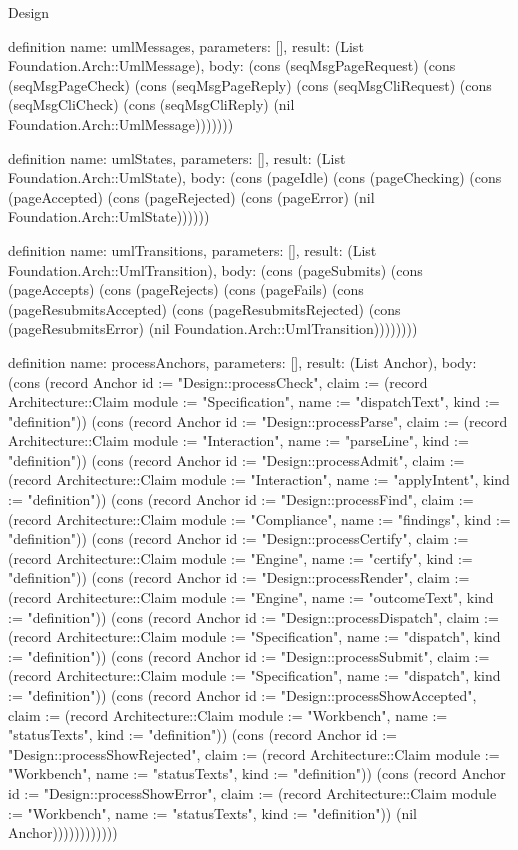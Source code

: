 \begin{lexlean}{Design}
\begin{semanticmodule}
definition{
  name: umlMessages,
  parameters: [],
  result: (List Foundation.Arch::UmlMessage),
  body: (cons (seqMsgPageRequest) (cons (seqMsgPageCheck) (cons (seqMsgPageReply) (cons (seqMsgCliRequest) (cons (seqMsgCliCheck) (cons (seqMsgCliReply) (nil Foundation.Arch::UmlMessage)))))))
}

definition{
  name: umlStates,
  parameters: [],
  result: (List Foundation.Arch::UmlState),
  body: (cons (pageIdle) (cons (pageChecking) (cons (pageAccepted) (cons (pageRejected) (cons (pageError) (nil Foundation.Arch::UmlState))))))
}

definition{
  name: umlTransitions,
  parameters: [],
  result: (List Foundation.Arch::UmlTransition),
  body: (cons (pageSubmits) (cons (pageAccepts) (cons (pageRejects) (cons (pageFails) (cons (pageResubmitsAccepted) (cons (pageResubmitsRejected) (cons (pageResubmitsError) (nil Foundation.Arch::UmlTransition))))))))
}

definition{
  name: processAnchors,
  parameters: [],
  result: (List Anchor),
  body: (cons (record Anchor {id := "Design::processCheck", claim := (record Architecture::Claim {module := "Specification", name := "dispatchText", kind := "definition"})}) (cons (record Anchor {id := "Design::processParse", claim := (record Architecture::Claim {module := "Interaction", name := "parseLine", kind := "definition"})}) (cons (record Anchor {id := "Design::processAdmit", claim := (record Architecture::Claim {module := "Interaction", name := "applyIntent", kind := "definition"})}) (cons (record Anchor {id := "Design::processFind", claim := (record Architecture::Claim {module := "Compliance", name := "findings", kind := "definition"})}) (cons (record Anchor {id := "Design::processCertify", claim := (record Architecture::Claim {module := "Engine", name := "certify", kind := "definition"})}) (cons (record Anchor {id := "Design::processRender", claim := (record Architecture::Claim {module := "Engine", name := "outcomeText", kind := "definition"})}) (cons (record Anchor {id := "Design::processDispatch", claim := (record Architecture::Claim {module := "Specification", name := "dispatch", kind := "definition"})}) (cons (record Anchor {id := "Design::processSubmit", claim := (record Architecture::Claim {module := "Specification", name := "dispatch", kind := "definition"})}) (cons (record Anchor {id := "Design::processShowAccepted", claim := (record Architecture::Claim {module := "Workbench", name := "statusTexts", kind := "definition"})}) (cons (record Anchor {id := "Design::processShowRejected", claim := (record Architecture::Claim {module := "Workbench", name := "statusTexts", kind := "definition"})}) (cons (record Anchor {id := "Design::processShowError", claim := (record Architecture::Claim {module := "Workbench", name := "statusTexts", kind := "definition"})}) (nil Anchor))))))))))))
}


\end{semanticmodule}
\end{lexlean}
